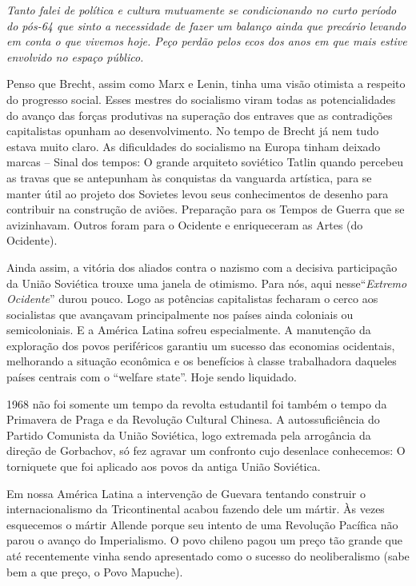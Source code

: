 \textit{Tanto falei de política e cultura mutuamente se condicionando no
curto período do pós-64 que sinto a necessidade de fazer um balanço
ainda que precário levando em conta o que vivemos hoje. Peço perdão
pelos ecos dos anos em que mais estive envolvido no espaço público.}

Penso que Brecht, assim como Marx e Lenin, tinha uma visão otimista a
respeito do progresso social. Esses mestres do socialismo viram todas as
potencialidades do avanço das forças produtivas na superação dos
entraves que as contradições capitalistas opunham ao desenvolvimento. No
tempo de Brecht já nem tudo estava muito claro. As dificuldades do
socialismo na Europa tinham deixado marcas -- Sinal dos tempos: O grande
arquiteto soviético Tatlin quando percebeu as travas que se antepunham
às conquistas da vanguarda artística, para se manter útil ao projeto dos
Sovietes levou seus conhecimentos de desenho para contribuir na
construção de aviões. Preparação para os Tempos de Guerra que se
avizinhavam. Outros foram para o Ocidente e enriqueceram as Artes (do
Ocidente).

Ainda assim, a vitória dos aliados contra o nazismo com a decisiva
participação da União Soviética trouxe uma janela de otimismo. Para nós,
aqui nesse“\textit{Extremo Ocidente}” durou pouco. Logo as potências
capitalistas fecharam o cerco aos socialistas que avançavam
principalmente nos países ainda coloniais ou semicoloniais. E a América
Latina sofreu especialmente. A manutenção da exploração dos povos
periféricos garantiu um sucesso das economias ocidentais, melhorando a
situação econômica e os benefícios à classe trabalhadora daqueles países
centrais com o “welfare state”. Hoje sendo liquidado.

1968 não foi somente um tempo da revolta estudantil foi também o tempo
da Primavera de Praga e da Revolução Cultural Chinesa. A
autossuficiência do Partido Comunista da União Soviética, logo extremada
pela arrogância da direção de Gorbachov, só fez agravar um confronto
cujo desenlace conhecemos: O torniquete que foi aplicado aos povos da
antiga União Soviética.

Em nossa América Latina a intervenção de Guevara tentando construir o
internacionalismo da Tricontinental acabou fazendo dele um mártir. Às
vezes esquecemos o mártir Allende porque seu intento de uma Revolução
Pacífica não parou o avanço do Imperialismo. O povo chileno pagou um
preço tão grande que até recentemente vinha sendo apresentado como o
sucesso do neoliberalismo (sabe bem a que preço, o Povo Mapuche).

